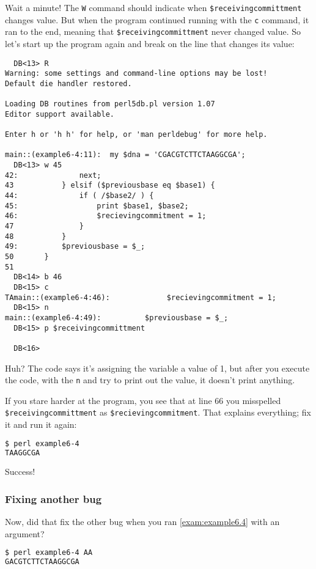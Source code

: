 Wait a minute! The \verb|W| command should indicate when \verb|$receivingcommittment| changes value. But when the program continued running with the \verb|c| command, it ran to the end, meaning that \verb|$receivingcommittment| never changed value. So let's start up the program again and break on the line that changes its value: 

\begin{lstlisting}
  DB<13> R
Warning: some settings and command-line options may be lost!
Default die handler restored.

Loading DB routines from perl5db.pl version 1.07
Editor support available.

Enter h or 'h h' for help, or 'man perldebug' for more help.

main::(example6-4:11):	my $dna = 'CGACGTCTTCTAAGGCGA';
  DB<13> w 45
42:              next;
43           } elsif ($previousbase eq $base1) {
44:              if ( /$base2/ ) {
45:                  print $base1, $base2; 
46:                  $recievingcommitment = 1;
47               }
48           }
49:          $previousbase = $_;
50       }
51
  DB<14> b 46
  DB<15> c
TAmain::(example6-4:46):             $recievingcommitment = 1;
  DB<15> n
main::(example6-4:49):          $previousbase = $_;
  DB<15> p $receivingcommittment

  DB<16> 
\end{lstlisting}

Huh? The code says it's assigning the variable a value of 1, but after you execute the code, with the \verb|n| and try to print out the value, it doesn't print anything.

If you stare harder at the program, you see that at line 66 you misspelled \verb|$receivingcommittment| as \verb|$recievingcommitment|. That explains everything; fix it and run it again:

\begin{lstlisting}[language=bash]
$ perl example6-4
TAAGGCGA 
\end{lstlisting}

Success! 

\subsubsection{Fixing another bug}
Now, did that fix the other bug when you ran \autoref{exam:example6.4} with an argument?

\begin{lstlisting}[language=bash]
$ perl example6-4 AA
GACGTCTTCTAAGGCGA
\end{lstlisting}

